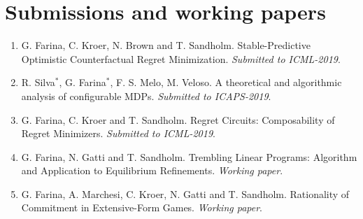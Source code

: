 \documentclass[10PT,letter]{article}
\newcounter{papercnt}
\newcommand{\equalcontrib}{$^*$}
\newcommand{\numbox}[1]{} %
\begin{document}
    \section*{\numbox{6}\bfseries\textcolor{titlecol}{\sffamily Submissions and working papers}}
        \begin{enumerate}[itemsep=.5mm]
            \setcounter{enumi}{\value{papercnt}}

            \item G. Farina, C. Kroer, N. Brown and T. Sandholm. Stable-Predictive Optimistic Counterfactual Regret Minimization. \emph{Submitted to ICML-2019}.

            \item R. Silva\equalcontrib{}, G. Farina\equalcontrib{}, F. S. Melo, M. Veloso. A theoretical and algorithmic analysis of configurable MDPs. \emph{Submitted to ICAPS-2019}.

            \item G. Farina, C. Kroer and T. Sandholm. Regret Circuits: Composability of Regret Minimizers. \emph{Submitted to ICML-2019}.

            \item G. Farina, N. Gatti and T. Sandholm. Trembling Linear Programs: Algorithm and Application to Equilibrium Refinements. \emph{Working paper}.
            
            \item G. Farina, A. Marchesi, C. Kroer, N. Gatti and T. Sandholm. Rationality of Commitment in Extensive-Form Games. \emph{Working paper}.
            
        \end{enumerate}
        \setcounter{papercnt}{\value{enumi}}
    
\end{document}
